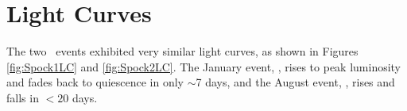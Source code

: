 \section{Light Curves}\label{sec:LightCurves}

The two \spock\ events exhibited very similar light curves, as shown in Figures \ref{fig:Spock1LC} and \ref{fig:Spock2LC}.  The January event, \spockone, rises to peak luminosity and fades back to quiescence in only $\sim$7 days, and the August event, \spocktwo, rises and falls in $<20$ days.  
  
  